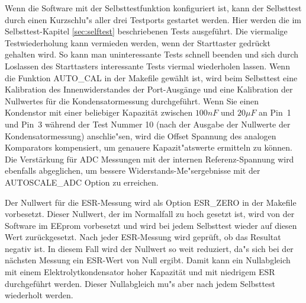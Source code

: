 Wenn die Software mit der Selbsttestfunktion konfiguriert ist, kann der Selbsttest durch einen Kurzschlu"s aller drei
Testports gestartet werden.
Hier werden die im Selbsttest-Kapitel \ref{sec:selftest} beschriebenen Tests ausgef\"uhrt. Die viermalige Testwiederholung
kann vermieden werden, wenn der Starttaster gedr\"uckt gehalten wird. So kann man uninteressante Tests schnell beenden und
sich durch Loslassen des Starttasters interessante Tests viermal wiederholen lassen.
Wenn die Funktion AUTO\_CAL in der Makefile gew\"ahlt ist, wird beim Selbsttest
eine Kalibration des Innenwiderstandes der Port-Ausg\"ange und
eine Kalibration der Nullwertes f\"ur die Kondensatormessung durchgef\"uhrt.
Wenn Sie einen Kondenstor mit einer beliebiger Kapazit\"at zwischen \(100 nF\) und \(20 \mu F\) an Pin~1 und Pin~3 
w\"ahrend der Test Nummer 10 (nach der Ausgabe der Nullwerte der Kondensatormessung) anschlie"sen,
wird die Offset Spannung des analogen Komparators kompensiert, um genauere Kapazit"atswerte ermitteln zu k\"onnen.
Die Verst\"arkung f\"ur ADC Messungen mit der internen Referenz-Spannung wird ebenfalls abgeglichen, um
bessere Widerstands-Me"sergebnisse mit der AUTOSCALE\_ADC Option zu erreichen.


Der Nullwert f\"ur die ESR-Messung wird als Option ESR\_ZERO in der Makefile vorbesetzt. Dieser Nullwert, der im
Normalfall zu hoch gesetzt ist, wird von der Software im EEprom vorbesetzt und wird bei jedem Selbsttest
wieder auf diesen Wert zur\"uckgesetzt.
Nach jeder ESR-Messung wird gepr\"uft, ob das Resultat negativ ist. In diesem Fall wird der Nullwert so weit
reduziert, da"s sich bei der n\"achsten Messung ein ESR-Wert von Null ergibt. Damit kann ein Nullabgleich mit
einem Elektrolytkondensator hoher Kapazit\"at und mit niedrigem ESR durchgef\"uhrt werden.
Dieser Nullabgleich mu"s aber nach jedem Selbsttest wiederholt werden.
